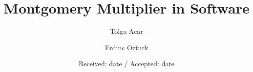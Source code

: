 \documentclass[twocolumn]{svjour3}          %
\begin{document}
\title{Montgomery Multiplier in Software%
}



\author{Tolga Acar \and Erdinc Ozturk}



\date{Received: date / Accepted: date }


\maketitle

\def\bfor{\bf for\hspace{1ex}}
\def\bto{\hspace{1ex}\bf to\hspace{1ex}}
\def\bif{\bf if\hspace{1ex}}
\def\bthen{\hspace{1ex}\bf then\hspace{1ex}}
\def\belse{\bf else\hspace{1ex}}
\def\bret{\bf ret\hspace{1ex}}

\newcommand{\mon}{\mbox{MonPro}}
\newcommand{\mwbox}[1]{\mbox{\hspace*{1ex}\mbox{#1}\hspace*{1em}}}
\newcommand{\eqref}[1]{\mbox{(\ref{#1})}}
\end{document}
